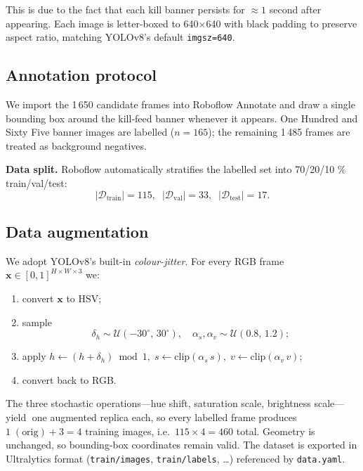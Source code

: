 \documentclass[10pt,twocolumn,letterpaper]{article}
\begin{document}
This is due to the fact that each kill banner persists for $\approx 1$ second after appearing. Each image is letter-boxed to 640\(\times\)640 with
black padding to preserve aspect ratio, matching YOLOv8’s default
\texttt{imgsz=640}.

\subsection{Annotation protocol}
We import the 1\,650 candidate frames into Roboflow Annotate
and draw a single bounding box around the kill-feed banner
whenever it appears.
One Hundred and Sixty Five banner images are labelled (\(n=165\));
the remaining 1\,485 frames are treated as background negatives.

\vspace{0.3em}\noindent
\textbf{Data split.}
Roboflow automatically stratifies the labelled set into
70/20/10 \% train/val/test:
%
\[
|\mathcal{D}_{\text{train}}| = 115,\;\;
|\mathcal{D}_{\text{val}}|   = 33,\;\;
|\mathcal{D}_{\text{test}}|  = 17.
\]

\subsection{Data augmentation}
We adopt YOLOv8’s built-in \emph{colour-jitter}.  
For every RGB frame \(\mathbf{x}\in[0,1]^{H\times W\times3}\) we:

\begin{enumerate}\itemsep2pt
  \item convert \(\mathbf{x}\) to \(\mathrm{HSV}\);
  \item sample
        \[
          \delta_h\sim\mathcal{U}(-30^{\circ},\,30^{\circ}),\quad
          \alpha_s,\alpha_v\sim\mathcal{U}(0.8,\,1.2);
        \]
  \item apply
        \(
          h\leftarrow(h+\delta_h)\bmod1,\;
          s\leftarrow\mathrm{clip}(\alpha_s\,s),\;
          v\leftarrow\mathrm{clip}(\alpha_v\,v)
        \);
  \item convert back to RGB.
\end{enumerate}

The three stochastic operations—hue shift,
saturation scale, brightness scale—yield  
\(\;\)one augmented replica each, so every labelled frame produces
\(1\;(\text{orig})+3=4\) training images, i.e.\ \(115\times4=460\) total.
Geometry is unchanged, so bounding-box coordinates remain valid.
The dataset is exported in Ultralytics format
(\texttt{train/images}, \texttt{train/labels}, …) referenced by
\texttt{data.yaml}.
\end{document}
